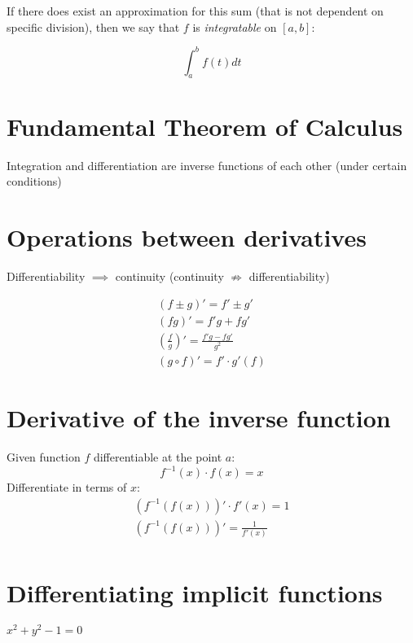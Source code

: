 \documentclass[00_complete]{subfiles}
\begin{document}
If there does exist an approximation for this sum (that is not dependent on
specific division), then we say that $f$ is \emph{integratable} on $[a,b]$:

$$\int_{a}^{b}f(t)dt$$

\section{Fundamental Theorem of Calculus}

Integration and differentiation are inverse functions of each other (under
certain conditions)

\section{Operations between derivatives}

\begin{note}
        Differentiability $\implies$ continuity
        (continuity $\nRightarrow$ differentiability)
\end{note}

\begin{gather}
    (f \pm g)' = f' \pm g' \\
    (fg)' = f'g+fg' \\
    \left(\frac{f}{g}\right)' = \frac{f'g-fg'}{g^2} \\
    (g \circ f)' = f' \cdot g'(f)
\end{gather}

\section{Derivative of the inverse function}

Given function $f$ differentiable at the point $a$:
\[
    f^{-1}(x) \cdot f(x) = x
\]
Differentiate in terms of $x$:
\[
\begin{gathered}
    (f^{-1}(f(x)))'\cdot f'(x) = 1 \\
    (f^{-1}(f(x)))' = \frac{1}{f'(x)} \\
\end{gathered}
\]

\section{Differentiating implicit functions}

\begin{example}
    $x^2+y^2-1=0$
\end{example}
\end{document}
